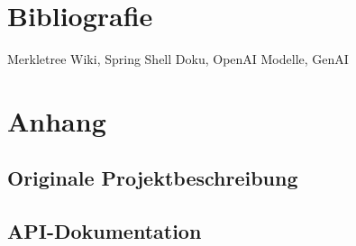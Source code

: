 \documentclass[a4paper,12pt]{report}
\begin{document}
    \clearpage
    \printindex

    \clearpage


    \chapter{Bibliografie}
    Merkletree Wiki, Spring Shell Doku, OpenAI Modelle, GenAI
    \appendix


    \chapter{Anhang}
    \clearpage

    \vspace*{\fill}
    \thispagestyle{empty}
    \titleformat{\section}{\centering\normalfont\Large\bfseries}{\thesection}{1em}{}


    \section{Originale Projektbeschreibung}\label{sec:originale-projektbeschreibung}
    \vspace*{\fill}
    


    \vspace*{\fill}
    \thispagestyle{empty}
    \titleformat{\section}{\centering\normalfont\Large\bfseries}{\thesection}{1em}{}


    \section{API-Dokumentation}\label{sec:api-spec}
    \vspace*{\fill}
    

    \vspace*{\fill}
    \thispagestyle{empty}
    \titleformat{\section}{\centering\normalfont\Large\bfseries}{\thesection}{1em}{}
\end{document}
